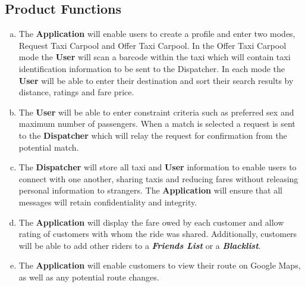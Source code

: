 \documentclass[english]{article}
\begin{document}
\subsection{Product Functions}
\label{sub:product_functions}
\begin{enumerate}[a)]
	\item The \textbf{Application} will enable users to create a profile and enter two modes, Request Taxi Carpool and Offer Taxi Carpool. In the Offer Taxi Carpool mode the \textbf{User} will scan a barcode within the taxi which will contain taxi identification information to be sent to the Dispatcher. In each mode the \textbf{User} will be able to enter their destination and sort their search results by distance, ratings and fare price. 
	
	\item The \textbf{User} will be able to enter constraint criteria such as preferred sex and maximum number of passengers. When a match is selected a request is sent to the \textbf{Dispatcher} which will relay the request for confirmation from the potential match. 
	
	\item The \textbf{Dispatcher} will store all taxi and \textbf{User} information to enable users to connect with one another, sharing taxis and reducing fares without releasing personal information to strangers. The \textbf{Application} will ensure that all messages will retain confidentiality and integrity.
	
	\item The \textbf{Application} will display the fare owed by each customer and allow rating of customers with whom the ride was shared. Additionally, customers will be able to add other riders to a \textbf{\emph{Friends List}} or a \textbf{\emph{Blacklist}}.
	
	\item The \textbf{Application} will enable customers to view their route on Google Maps, as well as any potential route changes.
\end{enumerate}
\end{document}
